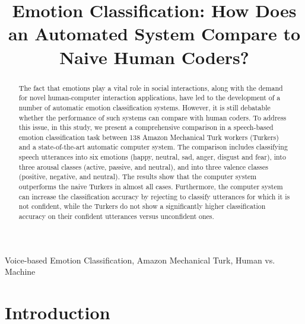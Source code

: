 \documentclass{article}
\title{Emotion Classification: How Does an Automated System Compare to Naive Human Coders?}
\begin{document}
\ninept 


\address{Dept. of Electrical and Computer Engineering, \\
	Dept. of Psychology, University of Rochester, Rochester, NY
	}


\maketitle

\begin{abstract}
	The fact that emotions play a vital role in social interactions, along with the demand for novel human-computer interaction applications, have led to the development of a number of automatic emotion classification systems. However, it is still debatable whether the performance of such systems can compare with human coders. To address this issue, in this study, we present a comprehensive comparison in a speech-based emotion classification task between 138 Amazon Mechanical Turk workers (Turkers) and a state-of-the-art automatic computer system. The comparison includes classifying speech utterances into six emotions (happy, neutral, sad, anger, disgust and fear), into three arousal classes (active, passive, and neutral), and into three valence classes (positive, negative, and neutral). The results show that the computer system outperforms the naive Turkers in almost all cases. Furthermore, the computer system can increase the classification accuracy by rejecting to classify utterances for which it is not confident, while the Turkers do not show a significantly higher classification accuracy on their confident utterances versus unconfident ones. 
		
\end{abstract}

\begin{keywords}
	Voice-based Emotion Classification, Amazon Mechanical Turk, Human vs. Machine
\end{keywords}

	
\section{Introduction} \label{Introduction}
\end{document}
